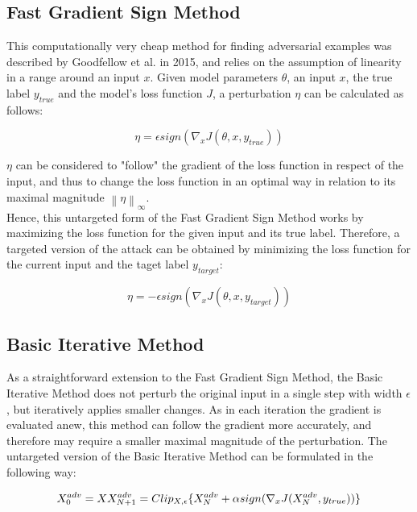 \documentclass[draft,final]{vutinfth} %
\newcommand{\norm}[1]{\left\lVert#1\right\rVert}
\begin{document}
\subsection{Fast Gradient Sign Method}

This computationally very cheap method for finding adversarial examples was described by Goodfellow et al. in 2015, and relies on the assumption of linearity in a range around an input $x$.
Given model parameters $\theta$, an input $x$, the true label $y_{true}$ and the model's loss function $J$, a perturbation $\eta$ can be calculated as follows:

\begin{equation}
	\eta = \epsilon sign(\nabla_xJ(\theta, x, y_{true}))
\end{equation}

$\eta$ can be considered to "follow" the gradient of the loss function in respect of the input, and thus to change the loss function in an optimal way in relation to its maximal magnitude $\norm{\eta}_\infty$.
\\
Hence, this untargeted form of the Fast Gradient Sign Method works by maximizing the loss function for the given input and its true label.
Therefore, a targeted version of the attack can be obtained by minimizing the loss function for the current input and the taget label $y_{target}$:
\cite{Goodfellow2015}

\begin{equation}
	\eta = -\epsilon sign(\nabla_xJ(\theta, x, y_{target}))
\end{equation}


\subsection{Basic Iterative Method}

As a straightforward extension to the Fast Gradient Sign Method, the Basic Iterative Method does not perturb the original input in a single step with width $\epsilon$, but iteratively applies smaller changes. As in each iteration the gradient is evaluated anew, this method can follow the gradient more accurately, and therefore may require a smaller maximal magnitude of the perturbation. The untargeted version of the Basic Iterative Method can be formulated in the following way:

\begin{equation}
	X^{adv}_0 = X \\
	X^{adv}_{N+1} = Clip_{X,\epsilon}\{X^{adv}_{N} + \alpha sign(\nabla_xJ(X^{adv}_{N}, y_{true})) \}
\end{equation}
\end{document}
